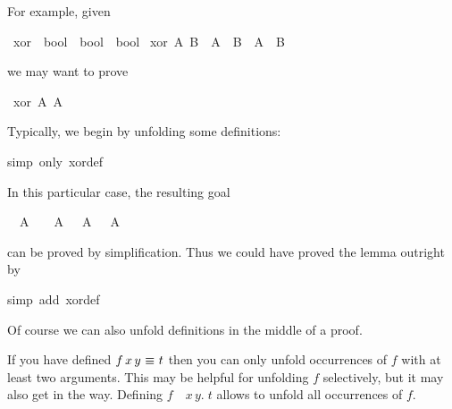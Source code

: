 \begin{isabellebody}
\begin{isamarkuptext}
For example, given%
\end{isamarkuptext}%
\isamarkuptrue%
\isamarkupfalse%
\ xor\ {\isacharcolon}{\isacharcolon}\ {\isachardoublequoteopen}bool\ {\isasymRightarrow}\ bool\ {\isasymRightarrow}\ bool{\isachardoublequoteclose}\ \isanewline
{\isachardoublequoteopen}xor\ A\ B\ {\isasymequiv}\ {\isacharparenleft}A\ {\isasymand}\ {\isasymnot}B{\isacharparenright}\ {\isasymor}\ {\isacharparenleft}{\isasymnot}A\ {\isasymand}\ B{\isacharparenright}{\isachardoublequoteclose}%
\begin{isamarkuptext}%
\noindent
we may want to prove%
\end{isamarkuptext}%
\isamarkuptrue%
\isamarkupfalse%
\ {\isachardoublequoteopen}xor\ A\ {\isacharparenleft}{\isasymnot}A{\isacharparenright}{\isachardoublequoteclose}%
\isadelimproof
%
\endisadelimproof
%
\isatagproof
%
\begin{isamarkuptxt}%
\noindent
Typically, we begin by unfolding some definitions:
%
\end{isamarkuptxt}%
\isamarkuptrue%
\isamarkupfalse%
{\isacharparenleft}simp\ only{\isacharcolon}\ xor{\isacharunderscore}def{\isacharparenright}%
\begin{isamarkuptxt}%
\noindent
In this particular case, the resulting goal
\begin{isabelle}%
\ {}{\isachardot}\ A\ {\isasymand}\ {\isasymnot}\ {\isasymnot}\ A\ {\isasymor}\ {\isasymnot}\ A\ {\isasymand}\ {\isasymnot}\ A%
\end{isabelle}
can be proved by simplification. Thus we could have proved the lemma outright by%
\end{isamarkuptxt}%
\isamarkuptrue%
%
\endisatagproof
{\isafoldproof}%
%
\isadelimproof
%
\endisadelimproof
%
\isadelimproof
%
\endisadelimproof
%
\isatagproof
{}\isamarkupfalse%
{\isacharparenleft}simp\ add{\isacharcolon}\ xor{\isacharunderscore}def{\isacharparenright}%
\endisatagproof
{\isafoldproof}%
%
\isadelimproof
%
\endisadelimproof
%
\begin{isamarkuptext}%
\noindent
Of course we can also unfold definitions in the middle of a proof.

\begin{warn}
  If you have defined $f\,x\,y~\emph{$\equiv$}~t$ then you can only unfold
  occurrences of $f$ with at least two arguments. This may be helpful for unfolding
  $f$ selectively, but it may also get in the way. Defining
  $f$~\isasymequiv~\isasymlambda$x\,y.\;t$ allows to unfold all occurrences of $f$.
\end{warn}


\end{isamarkuptext}
\end{isabellebody}
